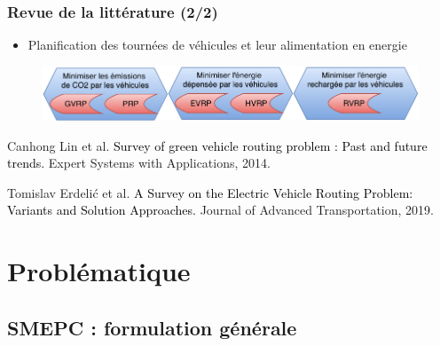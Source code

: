 \documentclass[hyperref={bookmarks=false},aspectratio=169]{beamer}
\begin{document}
\begin{frame}
\frametitle{Revue de la littérature (2/2)}
\begin{itemize}
\item Planification des tournées de véhicules et leur alimentation en energie
\end{itemize}
\begin{figure}
	\centering
    \includegraphics[width=\textwidth]{./figures/Etat_art_recharge.pdf}
	\label{Etat_art_recharge}
\end{figure}


\begin{thebibliography}{2}
 
    Canhong Lin et al. %
	\textcolor{black}{Survey of green vehicle routing problem : Past and future trends.}
	Expert Systems with Applications, 2014.
 
    Tomislav Erdelić et al. %
	\textcolor{black}{A Survey on the Electric Vehicle Routing Problem: Variants and Solution Approaches.}
	Journal of Advanced Transportation, 2019.
\end{thebibliography}
\end{frame}

\section{Problématique}

\subsection{SMEPC : formulation générale} 
\end{document}

